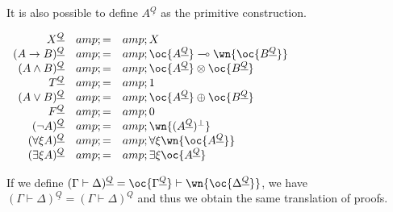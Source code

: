 It is also possible to define \(A^{\underline{Q}}\) as the primitive
construction.

\(\begin{array}{rcl}
X^{\underline{Q}} &amp; = &amp; X \\
(A\imp B)^{\underline{Q}} &amp; = &amp; \oc{A^{\underline{Q}}}\limp\wn{\oc{B^{\underline{Q}}}} \\
(A\wedge B)^{\underline{Q}} &amp; = &amp; \oc{A^{\underline{Q}}}\tens\oc{B^{\underline{Q}}} \\
T^{\underline{Q}} &amp; = &amp; \one \\
(A\vee B)^{\underline{Q}} &amp; = &amp; \oc{A^{\underline{Q}}}\plus\oc{B^{\underline{Q}}} \\
F^{\underline{Q}} &amp; = &amp; \zero \\
(\neg A)^{\underline{Q}} &amp; = &amp; \wn{(A^{\underline{Q}})\orth} \\
(\forall\xi A)^{\underline{Q}} &amp; = &amp; \forall\xi \wn{\oc{A^{\underline{Q}}}} \\
(\exists\xi A)^{\underline{Q}} &amp; = &amp; \exists\xi \oc{A^{\underline{Q}}}
\end{array}\)

If we define
\((\Gamma\vdash\Delta)^{\underline{Q}} = \oc{\Gamma^{\underline{Q}}}\vdash\wn{\oc{\Delta^{\underline{Q}}}}\),
we have
\((\Gamma\vdash\Delta)^{\underline{Q}} = (\Gamma\vdash\Delta)^Q\) and
thus we obtain the same translation of proofs.

